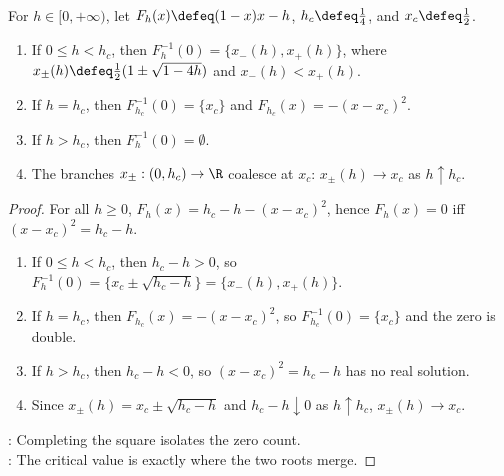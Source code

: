 \begin{proposition} \label{prop:harvested-logistic-equilibria} \\
For $h\in[0,+\infty)$, let $F_h(x)\defeq(1-x)x-h$, $h_c\defeq\frac14$, and $x_c\defeq\frac12$.
\begin{enumerate}[label=(\roman*)]
\setlength{\itemsep}{0pt}
\item If $0\leq h<h_c$, then $F_h^{-1}(0)=\{x_-(h),x_+(h)\}$, where $x_\pm(h)\defeq\frac12(1\pm\sqrt{1-4h})$ and $x_-(h)<x_+(h)$.
\item If $h=h_c$, then $F_{h_c}^{-1}(0)=\{x_c\}$ and $F_{h_c}(x)=-(x-x_c)^2$.
\item If $h>h_c$, then $F_h^{-1}(0)=\emptyset$.
\item The branches $x_\pm:(0,h_c)\to\R$ coalesce at $x_c$: $x_\pm(h)\to x_c$ as $h\uparrow h_c$.
\end{enumerate}
\begin{proof}
For all $h\geq0$, $F_h(x)=h_c-h-(x-x_c)^2$, hence $F_h(x)=0$ iff $(x-x_c)^2=h_c-h$.
\begin{enumerate}[label=(\roman*)]
\setlength{\itemsep}{0pt}
\item If $0\leq h<h_c$, then $h_c-h>0$, so $F_h^{-1}(0)=\{x_c\pm\sqrt{h_c-h}\}=\{x_-(h),x_+(h)\}$.
\item If $h=h_c$, then $F_{h_c}(x)=-(x-x_c)^2$, so $F_{h_c}^{-1}(0)=\{x_c\}$ and the zero is double.
\item If $h>h_c$, then $h_c-h<0$, so $(x-x_c)^2=h_c-h$ has no real solution.
\item Since $x_\pm(h)=x_c\pm\sqrt{h_c-h}$ and $h_c-h\downarrow0$ as $h\uparrow h_c$, $x_\pm(h)\to x_c$.
\end{enumerate}
: Completing the square isolates the zero count.\\
: The critical value is exactly where the two roots merge.
\end{proof}
\end{proposition}


